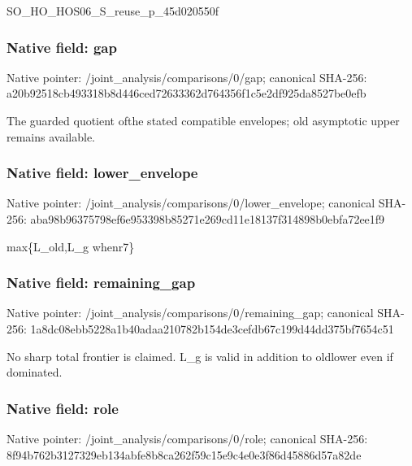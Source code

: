 \documentclass[10pt,a4paper]{article}
\begin{document}
\begingroup\raggedright\sloppy SO\_\allowbreak{}HO\_\allowbreak{}HOS06\_\allowbreak{}S\_\allowbreak{}reuse\_\allowbreak{}p\_\allowbreak{}45d020550f\par\endgroup

\subsubsection{Native field: gap}
Native pointer: /joint\_\allowbreak{}analysis/comparisons/0/gap; canonical SHA-256: a20b92518cb493318b8d446ced72633362d764356f1c5e2df925da8527be0efb

\begingroup\raggedright\sloppy The guarded quotient ofthe stated compatible envelopes;\allowbreak{} old asymptotic upper remains available.\par\endgroup

\subsubsection{Native field: lower\_\allowbreak{}envelope}
Native pointer: /joint\_\allowbreak{}analysis/comparisons/0/lower\_\allowbreak{}envelope; canonical SHA-256: aba98b96375798ef6e953398b85271e269cd11e18137f314898b0ebfa72ee1f9

\begingroup\raggedright\sloppy max\{L\_\allowbreak{}old,\allowbreak{}L\_\allowbreak{}g whenr7\}\par\endgroup

\subsubsection{Native field: remaining\_\allowbreak{}gap}
Native pointer: /joint\_\allowbreak{}analysis/comparisons/0/remaining\_\allowbreak{}gap; canonical SHA-256: 1a8dc08ebb5228a1b40adaa210782b154de3cefdb67c199d44dd375bf7654c51

\begingroup\raggedright\sloppy No sharp total frontier is claimed. L\_\allowbreak{}g is valid in addition to oldlower even if dominated.\par\endgroup

\subsubsection{Native field: role}
Native pointer: /joint\_\allowbreak{}analysis/comparisons/0/role; canonical SHA-256: 8f94b762b3127329eb134abfe8b8ca262f59c15e9c4e0e3f86d45886d57a82de
\end{document}
